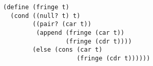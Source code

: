 \documentclass[a4paper,12pt]{article}
\begin{document}
\begin{lstlisting}
(define (fringe t)
  (cond ((null? t) t)
        ((pair? (car t))
         (append (fringe (car t))
                 (fringe (cdr t))))
        (else (cons (car t)
                    (fringe (cdr t))))))
\end{lstlisting}
\end{document}
